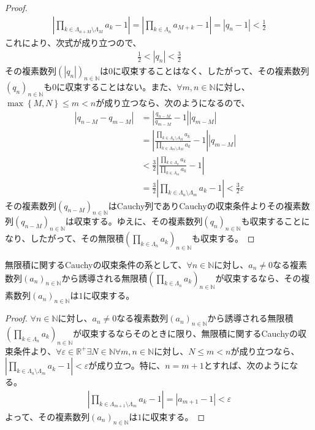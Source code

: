 \documentclass[dvipdfmx]{jsarticle}
\begin{document}
\begin{proof}
\begin{align*}
\left| \prod_{k \in \varLambda_{n + M} \setminus \varLambda_{M}} a_{k} - 1 \right| = \left| \prod_{k \in \varLambda_{n}} a_{M + k} - 1 \right| = \left| q_{n} - 1 \right| < \frac{1}{2}
\end{align*}
これにより、次式が成り立つので、
\begin{align*}
\frac{1}{2} < \left| q_{n} \right| < \frac{3}{2}
\end{align*}
その複素数列$\left( \left| q_{n} \right| \right)_{n \in \mathbb{N}}$は$0$に収束することはなく、したがって、その複素数列$\left( q_{n} \right)_{n \in \mathbb{N}}$も$0$に収束することはない。また、$\forall m,n \in \mathbb{N}$に対し、$\max\left\{ M,N \right\} \leq m < n$が成り立つなら、次のようになるので、
\begin{align*}
\left| q_{n - M} - q_{m - M} \right| &= \left| \frac{q_{n - M}}{q_{m - M}} - 1 \right|\left| q_{m - M} \right|\\
&= \left| \frac{\prod_{k \in \varLambda_{n} \setminus \varLambda_{M}} a_{k}}{\prod_{k \in \varLambda_{m} \setminus \varLambda_{M}} a_{k}} - 1 \right|\left| q_{m - M} \right|\\
&< \frac{3}{2}\left| \frac{\prod_{k \in \varLambda_{n}} a_{k}}{\prod_{k \in \varLambda_{m}} a_{k}} - 1 \right|\\
&= \frac{3}{2}\left| \prod_{k \in \varLambda_{n} \setminus \varLambda_{m}} a_{k} - 1 \right| < \frac{3}{2}\varepsilon
\end{align*}
その複素数列$\left( q_{n - M} \right)_{n \in \mathbb{N}}$はCauchy列でありCauchyの収束条件よりその複素数列$\left( q_{n - M} \right)_{n \in \mathbb{N}}$は収束する。ゆえに、その複素数列$\left( q_{n} \right)_{n \in \mathbb{N}}$も収束することになり、したがって、その無限積$\left( \prod_{k \in \varLambda_{n}} a_{k} \right)_{n \in \mathbb{N}}$も収束する。
\end{proof}
\begin{thm}\label{4.3.4.2}
無限積に関するCauchyの収束条件の系として、$\forall n \in \mathbb{N}$に対し、$a_{n} \neq 0$なる複素数列$\left( a_{n} \right)_{n \in \mathbb{N}}$から誘導される無限積$\left( \prod_{k \in \varLambda_{n}} a_{k} \right)_{n \in \mathbb{N}}$が収束するなら、その複素数列$\left( a_{n} \right)_{n \in \mathbb{N}}$は$1$に収束する。
\end{thm}
\begin{proof}
$\forall n \in \mathbb{N}$に対し、$a_{n} \neq 0$なる複素数列$\left( a_{n} \right)_{n \in \mathbb{N}}$から誘導される無限積$\left( \prod_{k \in \varLambda_{n}} a_{k} \right)_{n \in \mathbb{N}}$が収束するならそのときに限り、無限積に関するCauchyの収束条件より、$\forall\varepsilon \in \mathbb{R}^{+}\exists N \in \mathbb{N}\forall m,n \in \mathbb{N}$に対し、$N \leq m < n$が成り立つなら、$\left| \prod_{k \in \varLambda_{n} \setminus \varLambda_{m}} a_{k} - 1 \right| < \varepsilon$が成り立つ。特に、$n = m + 1$とすれば、次のようになる。
\begin{align*}
\left| \prod_{k \in \varLambda_{m + 1} \setminus \varLambda_{m}} a_{k} - 1 \right| = \left| a_{m + 1} - 1 \right| < \varepsilon
\end{align*}
よって、その複素数列$\left( a_{n} \right)_{n \in \mathbb{N}}$は$1$に収束する。
\end{proof}
\end{document}
